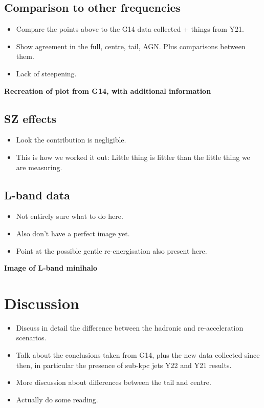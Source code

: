 \documentclass{pas}
\begin{document}
\subsection{Comparison to other frequencies}
\begin{itemize}
  \item Compare the points above to the G14 data collected + things from Y21.
  \item Show agreement in the full, centre, tail, AGN. Plus comparisons between them.
  \item Lack of steepening.
\end{itemize}
\textbf{Recreation of plot from G14, with additional information}

\subsection{SZ effects}
\begin{itemize}
  \item Look the contribution is negligible.
  \item This is how we worked it out: Little thing is littler than the little thing we are measuring.
\end{itemize}

\subsection{L-band data}
\begin{itemize}
  \item Not entirely sure what to do here.
  \item Also don't have a perfect image yet.
  \item Point at the possible gentle re-energisation also present here.
\end{itemize}
\textbf{Image of L-band minihalo}

\section{Discussion}
\begin{itemize}
  \item Discuss in detail the difference between the hadronic and re-acceleration scenarios.
  \item Talk about the conclusions taken from G14, plus the new data collected since then, in particular the presence of sub-kpc jets Y22 and Y21 results.
  \item More discussion about differences between the tail and centre. 
  \item Actually do some reading.
\end{itemize}
\end{document}
